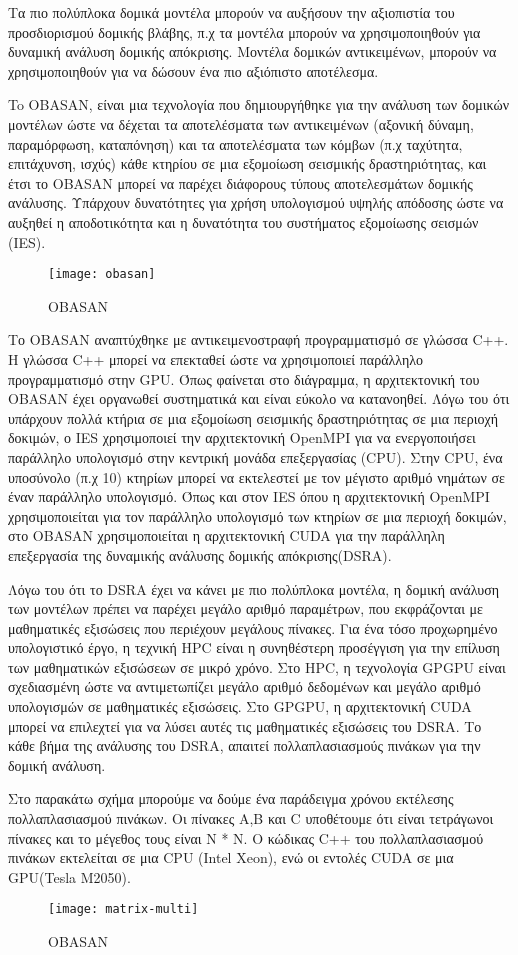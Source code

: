 Τα πιο πολύπλοκα δομικά μοντέλα μπορούν να αυξήσουν την αξιοπιστία του προσδιορισμού δομικής βλάβης, π.χ τα μοντέλα μπορούν να χρησιμοποιηθούν για δυναμική ανάλυση δομικής απόκρισης. Μοντέλα δομικών αντικειμένων, μπορούν να χρησιμοποιηθούν για να δώσουν ένα πιο αξιόπιστο αποτέλεσμα. 

To OBASAN, είναι μια τεχνολογία που δημιουργήθηκε για την ανάλυση των δομικών μοντέλων ώστε να δέχεται τα αποτελέσματα των αντικειμένων (αξονική δύναμη, παραμόρφωση, καταπόνηση) και τα αποτελέσματα των κόμβων (π.χ ταχύτητα, επιτάχυνση, ισχύς) κάθε κτηρίου σε μια εξομοίωση σεισμικής δραστηριότητας, και έτσι το OBASAN μπορεί να παρέχει διάφορους τύπους αποτελεσμάτων δομικής ανάλυσης. Υπάρχουν δυνατότητες για χρήση υπολογισμού υψηλής απόδοσης ώστε να αυξηθεί η αποδοτικότητα και η δυνατότητα του συστήματος εξομοίωσης σεισμών (IES). 

\begin{figure}[h]
\centering
\texttt{[image: obasan]}
\caption{OBASAN}
\end{figure}

Το OBASAN αναπτύχθηκε με αντικειμενοστραφή προγραμματισμό σε γλώσσα C++. Η γλώσσα C++ μπορεί να επεκταθεί ώστε να χρησιμοποιεί παράλληλο προγραμματισμό στην GPU. Όπως φαίνεται στο διάγραμμα, η αρχιτεκτονική του OBASAN έχει οργανωθεί συστηματικά και είναι εύκολο να κατανοηθεί. Λόγω του ότι υπάρχουν πολλά κτήρια σε μια εξομοίωση σεισμικής δραστηριότητας σε μια περιοχή δοκιμών, ο IES χρησιμοποιεί την αρχιτεκτονική OpenMPI για να ενεργοποιήσει παράλληλο υπολογισμό στην κεντρική μονάδα επεξεργασίας (CPU). Στην CPU, ένα υποσύνολο (π.χ 10) κτηρίων μπορεί να εκτελεστεί με τον μέγιστο αριθμό νημάτων σε έναν παράλληλο υπολογισμό. Όπως και στον IES όπου η αρχιτεκτονική OpenMPI χρησιμοποιείται για τον παράλληλο υπολογισμό των κτηρίων σε μια περιοχή δοκιμών, στο OBASAN χρησιμοποιείται η αρχιτεκτονική CUDA για την παράλληλη επεξεργασία της δυναμικής ανάλυσης δομικής απόκρισης(DSRA).

Λόγω του ότι το DSRA έχει να κάνει με πιο πολύπλοκα μοντέλα, η δομική ανάλυση των μοντέλων πρέπει να παρέχει μεγάλο αριθμό παραμέτρων, που εκφράζονται με μαθηματικές εξισώσεις που περιέχουν μεγάλους πίνακες. Για ένα τόσο προχωρημένο υπολογιστικό έργο, η τεχνική HPC είναι η συνηθέστερη προσέγγιση για την επίλυση των μαθηματικών εξισώσεων σε μικρό χρόνο. Στο HPC, η τεχνολογία GPGPU είναι σχεδιασμένη ώστε να αντιμετωπίζει μεγάλο αριθμό δεδομένων και μεγάλο αριθμό υπολογισμών σε μαθηματικές εξισώσεις. Στο GPGPU, η αρχιτεκτονική CUDA μπορεί να επιλεχτεί για να λύσει αυτές τις μαθηματικές εξισώσεις του DSRA. Το κάθε βήμα της ανάλυσης του DSRA, απαιτεί πολλαπλασιασμούς πινάκων για την δομική ανάλυση.

Στο παρακάτω σχήμα μπορούμε να δούμε ένα παράδειγμα χρόνου εκτέλεσης πολλαπλασιασμού πινάκων. Οι πίνακες Α,Β και C υποθέτουμε ότι είναι τετράγωνοι πίνακες και το μέγεθος τους είναι Ν * Ν. Ο κώδικας C++ του πολλαπλασιασμού πινάκων εκτελείται σε μια CPU (Intel Xeon), ενώ οι εντολές CUDA σε μια GPU(Tesla M2050). 

\begin{figure}[h]
\centering
\texttt{[image: matrix-multi]}
\caption{OBASAN}
\end{figure}

